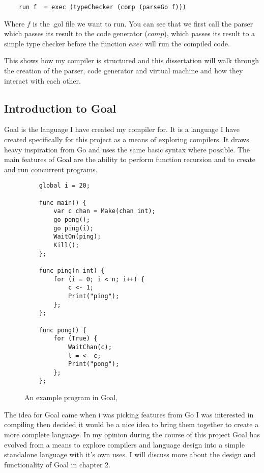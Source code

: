 \begin{lstlisting}
 	run f  = exec (typeChecker (comp (parseGo f)))
\end{lstlisting}

Where $f$ is the .gol file we want to run. You can see that we first call the parser which passes its result to the code generator ($comp$), which passes its result to a simple type checker before the function $exec$ will run the compiled code. 

This shows how my compiler is structured and this dissertation will walk through the creation of the parser, code generator and virtual machine and how they interact with each other.

\subsection{Introduction to Goal}

Goal is the language I have created my compiler for. It is a language I have created specifically for this project as a means of exploring compilers. It draws heavy inspiration from Go and uses the same basic syntax where possible. The main features of Goal are the ability to perform function recursion and to create and run concurrent programs.

\begin{figure}[h]
\begin{lstlisting}
	global i = 20;
	
	func main() { 
	    var c chan = Make(chan int);
	    go pong();
	    go ping(i);
	    WaitOn(ping);
	    Kill();
	};
	
	func ping(n int) {
	    for (i = 0; i < n; i++) {
	        c <- 1;
	        Print("ping");
	    };    
	};
	
	func pong() {
	    for (True) {
	        WaitChan(c);
	        l = <- c;
	        Print("pong");
	    };    
	};
\end{lstlisting}
\caption{An example program in Goal, }
\label{fig:goalExample} 
\end{figure}

The idea for Goal came when i was picking features from Go I was interested in compiling then decided it would be a nice idea to bring them together to create a more complete language. In my opinion during the course of this project Goal has evolved from a means to explore compilers and language design into a simple standalone language with it's own uses. I will discuss more about the design and functionality of Goal in chapter 2.


